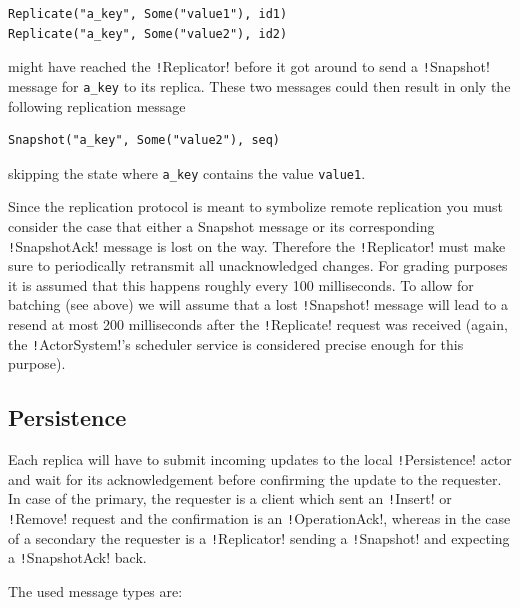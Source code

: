 \documentclass{article}
\begin{document}
\begin{verbatim}
Replicate("a_key", Some("value1"), id1) 
Replicate("a_key", Some("value2"), id2) 
\end{verbatim}
might have reached the \texttt!Replicator! before it got around to send a \texttt!Snapshot! message for \texttt{a_key} to its replica. These two messages could then result in only the following replication message

\begin{verbatim}
Snapshot("a_key", Some("value2"), seq) 
\end{verbatim}

skipping the state where \texttt{a_key} contains the value \texttt{value1}.

Since the replication protocol is meant to symbolize remote replication you must consider the case that either a Snapshot message or its corresponding \texttt!SnapshotAck! message is lost on the way. Therefore the \texttt!Replicator!  must make sure to periodically retransmit all unacknowledged changes.  For grading purposes it is assumed that this happens roughly every 100  milliseconds. To allow for batching (see above) we will assume that a  lost \texttt!Snapshot! message will lead to a resend at most 200 milliseconds after the \texttt!Replicate! request was received (again, the \texttt!ActorSystem!’s scheduler service is considered precise enough for this purpose).

\subsection{Persistence}\label{ss:persistence}

Each replica will have to submit incoming updates to the local \texttt!Persistence! actor and wait for its acknowledgement before confirming the update to the requester. In case of the primary, the requester is a client which sent an \texttt!Insert! or \texttt!Remove! request and the confirmation is an \texttt!OperationAck!, whereas in the case of a secondary the requester is a \texttt!Replicator! sending a \texttt!Snapshot! and expecting a \texttt!SnapshotAck! back.

The used message types are:
\end{document}
